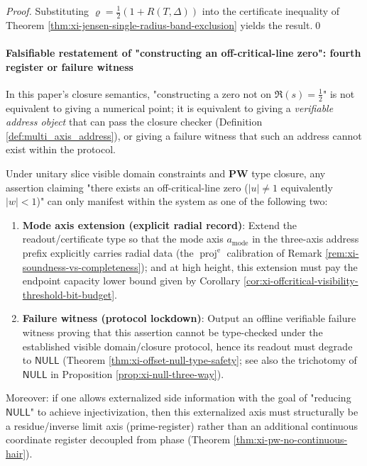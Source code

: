 \begin{proof}
Substituting \(\varrho=\tfrac12(1+R(T,\Delta))\) into the certificate inequality of Theorem \ref{thm:xi-jensen-single-radius-band-exclusion} yields the result.\qed
\end{proof}

\paragraph{Falsifiable restatement of "constructing an off-critical-line zero": fourth register or failure witness}
In this paper's closure semantics, "constructing a zero not on \(\Re(s)=\tfrac12\)" is not equivalent to giving a numerical point;
it is equivalent to giving a \emph{verifiable address object} that can pass the closure checker (Definition \ref{def:multi_axis_address}), or giving a failure witness that such an address cannot exist within the protocol.

\begin{proposition}\label{prop:xi-offcritical-falsifiable-restatement}
Under unitary slice visible domain constraints and \(\mathbf{PW}\) type closure, any assertion claiming "there exists an off-critical-line zero (\(|u|\neq 1\) equivalently \(|w|<1\))" can only manifest within the system as one of the following two:
\begin{enumerate}
  \item \textbf{Mode axis extension (explicit radial record)}: Extend the readout/certificate type so that the mode axis \(a_{\mathrm{mode}}\) in the three-axis address prefix explicitly carries radial data (the \(\operatorname{proj}^{\mathrm e}\) calibration of Remark \ref{rem:xi-soundness-vs-completeness}); and at high height, this extension must pay the endpoint capacity lower bound given by Corollary \ref{cor:xi-offcritical-visibility-threshold-bit-budget}.
  \item \textbf{Failure witness (protocol lockdown)}: Output an offline verifiable failure witness proving that this assertion cannot be type-checked under the established visible domain/closure protocol, hence its readout must degrade to \(\mathsf{NULL}\) (Theorem \ref{thm:xi-offset-null-type-safety}; see also the trichotomy of \(\mathsf{NULL}\) in Proposition \ref{prop:xi-null-three-way}).
\end{enumerate}
Moreover: if one allows externalized side information with the goal of "reducing \(\mathsf{NULL}\)" to achieve injectivization, then this externalized axis must structurally be a residue/inverse limit axis (prime-register) rather than an additional continuous coordinate register decoupled from phase (Theorem \ref{thm:xi-pw-no-continuous-hair}).
\end{proposition}

